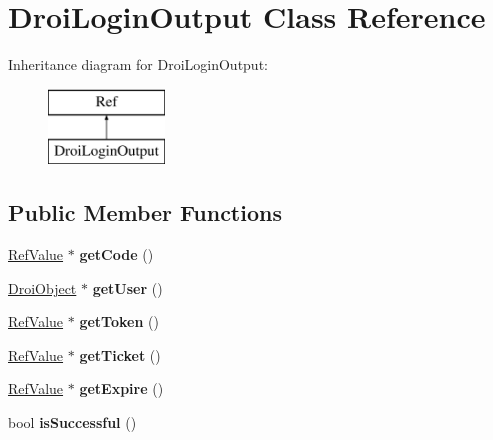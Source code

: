 \hypertarget{class_droi_login_output}{}\section{Droi\+Login\+Output Class Reference}
\label{class_droi_login_output}
Inheritance diagram for Droi\+Login\+Output\+:\begin{figure}[H]
\begin{center}
\leavevmode
\includegraphics[height=2.000000cm]{d1/d05/class_droi_login_output}
\end{center}
\end{figure}
\subsection*{Public Member Functions}
\begin{DoxyCompactItemize}
\item 
\mbox{\label{class_droi_login_output_a58034fb4cbcf5d56db397231e749f1b5}} 
\hyperlink{class_ref_value}{Ref\+Value} $\ast$ {\bfseries get\+Code} ()
\item 
\mbox{\label{class_droi_login_output_a8c08e336428c578a700c0155ca6c3fdf}} 
\hyperlink{class_droi_object}{Droi\+Object} $\ast$ {\bfseries get\+User} ()
\item 
\mbox{\label{class_droi_login_output_a39c9ea32fee5174fbd3a2bf96ebb85dc}} 
\hyperlink{class_ref_value}{Ref\+Value} $\ast$ {\bfseries get\+Token} ()
\item 
\mbox{\label{class_droi_login_output_a948351d32a389cc559d63f81709df859}} 
\hyperlink{class_ref_value}{Ref\+Value} $\ast$ {\bfseries get\+Ticket} ()
\item 
\mbox{\label{class_droi_login_output_aa928a3b520146ac06f826867ae9e6e62}} 
\hyperlink{class_ref_value}{Ref\+Value} $\ast$ {\bfseries get\+Expire} ()
\item 
\mbox{\label{class_droi_login_output_a10154821cb8f4ca9b7b1a215164b352b}} 
bool {\bfseries is\+Successful} ()
\end{DoxyCompactItemize}
